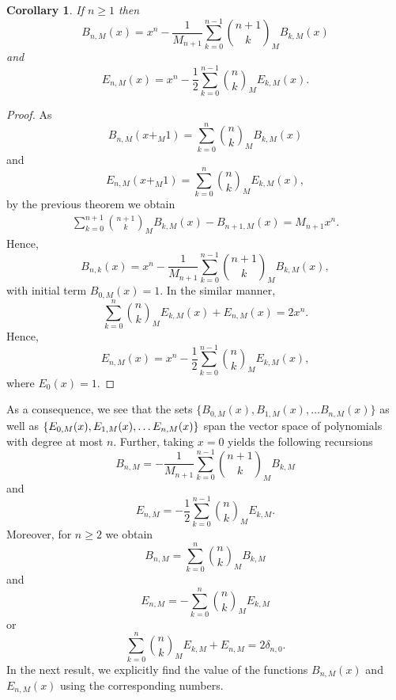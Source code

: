 \documentclass[12pt, a4paper]{article}
\newtheorem{corollary}[theorem]{Corollary}
\begin{document}
\begin{corollary}
If $n\geq 1$ then
\begin{equation*}
B_{n,M}(x) = x^n-\frac{1}{M_{n+1}}\sum_{k=0}^{n-1}\binom{n+1}{k}_MB_{k,M}(x)
\end{equation*}
and
\begin{equation*}
E_{n,M}(x) = x^n-\frac{1}{2}\sum_{k=0}^{n-1}\binom{n}{k}_ME_{k,M}(x).
\end{equation*}
\end{corollary}
\begin{proof}
As \[B_{n,M}(x+_M1) = \sum_{k=0}^{n}\binom{n}{k}_MB_{k,M}(x)\]
and \[E_{n,M}(x+_M1) = \sum_{k=0}^{n}\binom{n}{k}_ME_{k,M}(x),\]
by the previous theorem we obtain 
\begin{align*}
\sum_{k=0}^{n+1}\binom{n+1}{k}_MB_{k,M}(x)-B_{n+1,M}(x) = M_{n+1} x^{n}.
\end{align*}
Hence, 
\[B_{n,k}(x) = x^n-\frac{1}{M_{n+1}}\sum_{k=0}^{n-1}\binom{n+1}{k}_MB_{k,M}(x),\]
with initial term $B_{0,M}(x) = 1.$
In the similar manner,
\[\sum_{k=0}^{n}\binom{n}{k}_ME_{k,M}(x)+ E_{n,M}(x) = 2x^n.\]
Hence,
\[E_{n,M}(x) = x^n-\frac{1}{2}\sum_{k=0}^{n-1}\binom{n}{k}_ME_{k,M}(x),\]
where $E_0(x) = 1.$
\end{proof}
As a consequence, we see that the sets $\{B_{0,M}(x), B_{1,M}(x), \dots B_{n,M}(x)\}$ as well as $\{E_{0,M}(x), \\E_{1,M}(x), \dots E_{n,M}(x)\}$ span the vector space of polynomials with degree at most $n.$
Further, taking $x=0$ yields the following recursions
\begin{equation}
B_{n,M} = -\frac{1}{M_{n+1}}\sum_{k=0}^{n-1}\binom{n+1}{k}_MB_{k,M}
\end{equation}
and 
\begin{equation}
E_{n,M} = -\frac{1}{2}\sum_{k=0}^{n-1}\binom{n}{k}_ME_{k,M}.
\end{equation}
Moreover, for $n \geq 2$ we obtain
\begin{equation} \label{eq: B1}
B_{n,M} = \sum_{k=0}^{n}\binom{n}{k}_MB_{k,M}
\end{equation}
and
\begin{equation} \label{eq: E1}
E_{n,M} = -\sum_{k=0}^{n}\binom{n}{k}_ME_{k,M}
\end{equation}
or 
\begin{equation} \label{eq: E2}
\sum_{k=0}^{n}\binom{n}{k}_ME_{k,M}+E_{n,M} = 2\delta_{n,0}.
\end{equation}
In the next result, we explicitly find the value of the functions $B_{n,M}(x)$ and $E_{n,M}(x)$ using the corresponding numbers.
\end{document}
